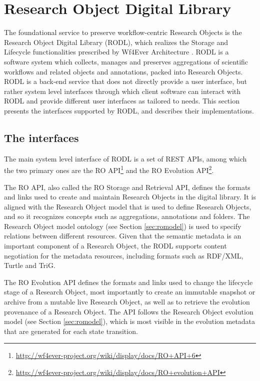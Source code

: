 \section{Research Object Digital Library}
\label{sec:rodl}


The foundational service to preserve workflow-centric Research Objects is the Research Object Digital Library (RODL), which realizes the Storage and Lifecycle functionalities prescribed by Wf4Ever Architecture \cite{w4fever_d132}. RODL is a software system which collects, manages and preserves aggregations of scientific workflows and related objects and annotations, packed into Research Objects. RODL is a back-end service that does not directly provide a user interface, but rather system level interfaces through which client software can interact with RODL and provide different user interfaces as tailored to needs. This section presents the interfaces supported by RODL, and describes their implementations.

\subsection{The interfaces}

The main system level interface of RODL is a set of REST APIs, among which the two primary ones are the RO API\footnote{\url{http://wf4ever-project.org/wiki/display/docs/RO+API+6}} and the RO Evolution API\footnote{\url{http://wf4ever-project.org/wiki/display/docs/RO+evolution+API}}.

The RO API, also called the RO Storage and Retrieval API, defines the formats and links used to create and maintain Research Objects in the digital library. It is aligned with the Research Object model that is used to define Research Objects, and so it recognizes concepts such as aggregations, annotations and folders. The Research Object model ontology (see Section \ref{sec:romodel}) is used to specify relations between different resources. Given that the semantic metadata is an important component of a Research Object, the RODL supports content negotiation for the metadata resources, including formats such as RDF/XML, Turtle and TriG.

The RO Evolution API defines the formats and links used to change the lifecycle stage of a Research Object, most importantly to create an immutable snapshot or archive from a mutable live Research Object, as well as to retrieve the evolution provenance of a Research Object. The API follows the Research Object evolution model (see Section \ref{sec:romodel}), which is most visible in the evolution metadata that are generated for each state transition.

